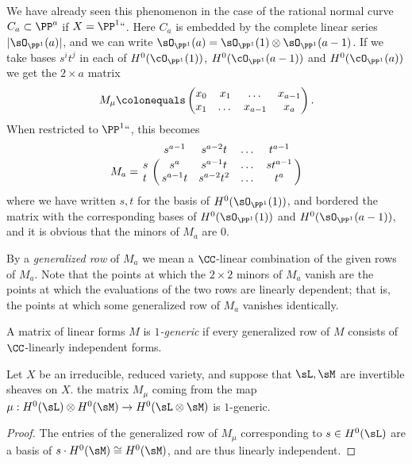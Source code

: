 \begin{example}
We have already seen this phenomenon in the case of the rational normal
curve $C_a\subset \PP^a$ if $X = \PP^1` `$.
Here $C_{a}$ is embedded by the complete
linear series $|\sO_{\PP^1}(a)|$, and  we can write $\sO_{\PP^1}(a) =
\sO_{\PP^1}(1)\otimes \sO_{\PP^1}(a-1)$.
If we take bases $s^it^j$ in each of $H^0(\cO_{\PP^1}(1))$,
$H^0(\cO_{\PP^1}(a-1))$ and $H^0(\cO_{\PP^1}(a))$
we get
the $2\times a$ matrix
$$
M_\mu \colonequals
\begin{pmatrix}
x_0&x_1&\dots&x_{a-1}\\
x_1&\dots&x_{a-1}&x_a
\end{pmatrix}.
$$
When restricted to $\PP^1` `$, this becomes
$$
M_a = \bordermatrix{
& s^{a-1}&s^{a-2}t&\dots&t^{a-1}\cr
s&  s^{a}& s^{a-1}t&\dots&st^{a-1}\cr
t&  s^{a-1}t& s^{a-2}t^{2}&\dots&t^{a}\cr
}$$
where we have written $s,t$ for the basis of $H^0(\sO_{\PP^1}(1))$,
and bordered the matrix
with the corresponding bases of $H^0(\sO_{\PP^1}(1))$ and
$H^0(\sO_{\PP^1}(a-1))$, and it is obvious
that the minors of $M_a$ are 0.
\end{example}

By a \emph{generalized row} of $M_{a}$ we mean a $\CC$-linear combination
%
of the given rows of $M_{a}$. Note that the points at which the $2\times2$ 
minors of $M_{a}$ vanish are the points at which the evaluations of
the two rows are linearly dependent; that is, the points at which some
generalized row of $M_{a}$ vanishes identically.

\begin{definition}
A matrix of linear forms $M$ is  \emph{$1$-generic} if every generalized
row of $M$
consists of $\CC$-linearly independent forms.
%
\end{definition}

\begin{proposition}\label{some generators}\label{some equations}
Let $X$ be
an irreducible, reduced variety, and suppose that $\sL,\sM$ are invertible
sheaves on $X$.
the matrix $M_\mu$ coming from the map $\mu:H^0(\sL) \otimes H^0(\sM)
\to H^0(\sL\otimes \sM)$
is $1$-generic.
\unif
\end{proposition}

\begin{proof} The entries of the generalized row of $M_\mu$ corresponding
to $s\in H^0(\sL)$
are a basis of $s\cdot H^0(\sM) \cong H^0(\sM)$, and are thus
linearly independent.
\end{proof}

